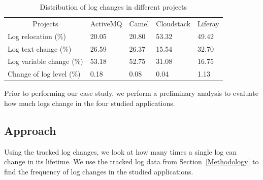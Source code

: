 \begin{table}
	\centering
	\caption{Distribution of log changes in different projects}
	\label{tba:logtype}
	\begin{tabular}{l|llll}
		\cline{1-5}  	\multicolumn{1}{|c}{Projects}    & \multicolumn{1}{|c}{ ActiveMQ }  &  \multicolumn{1}{|c}{ Camel}	   &  \multicolumn{1}{|c}{ Cloudstack }  & 
		\multicolumn{1}{|c|}{ Liferay } \\ \cline{1-5}   
		
		Log relocation (\%)       & 20.05     & 20.80 &  53.32  & 49.42         \\
		
		Log text change (\%)      & 26.59    & 26.37 & 15.54    & 32.70       \\
		Log variable change (\%)   & 53.18     & 52.75 & 31.08 &  16.75     \\
		Change of log level (\%) & 0.18   & 0.08 & 0.04  &  1.13       \\ 
\cline{1-5}
	\end{tabular}
\end{table}


Prior to performing our case study, we perform a preliminary analysis to evaluate how much logs change in the four studied applications.
\subsection{Approach}
Using the tracked log changes, we look at how many times a single log can change in its lifetime. We use the tracked log data from Section~\ref{Methodology} to find the frequency of log changes in the studied applications. 





